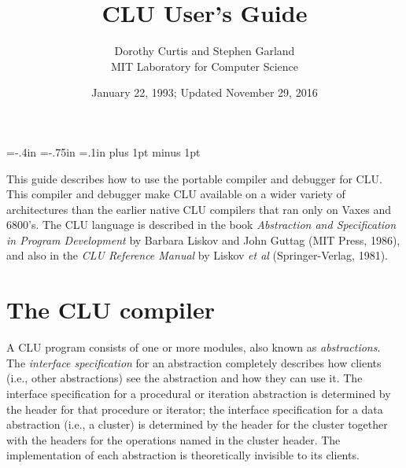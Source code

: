 \textwidth=5.75in
\textheight=7.875in
\hoffset=-.4in
\voffset=-.75in
\parskip=.1in plus 1pt minus 1pt
\leftmargini=12pt
\topsep=0pt
\partopsep=0pt
\itemsep=0pt
\marginparwidth=0.7in
\newcommand{\dir}[1]{{\em #1}}
\newcommand{\proc}[1]{{\em #1}}
\newcommand{\cludir}[1]{\dir{\~{}CLU}{\em #1}}
\newcommand{\fname}[1]{{\em #1}}
\newenvironment{boxdisplay}{\begin{center}\begin{tabular}{|l|}\hline}{\hline\end{tabular}\end{center}}


\title{CLU User's Guide}
\date{January 22, 1993; Updated November 29, 2016}
\author{Dorothy Curtis and Stephen Garland\\
        MIT Laboratory for Computer Science}


\thispagestyle{empty}

\maketitle

This guide describes how to use the portable compiler and debugger for CLU.
This compiler and debugger make CLU available on a wider variety of
architectures than the earlier native CLU compilers that ran only on Vaxes and
6800's.  The CLU language is described in the book {\em Abstraction and
Specification in Program Development} by Barbara Liskov and John Guttag (MIT
Press, 1986), and also in the {\em CLU Reference Manual} by Liskov {\it et al}
(Springer-Verlag, 1981).

\section{The CLU compiler}
\label{clu}

A CLU program consists of one or more modules, also known as {\em
abstractions}.  The {\em interface specification} for an abstraction completely
describes how clients (i.e., other abstractions) see the abstraction and how
they can use it.  The interface specification for a procedural or iteration
abstraction is determined by the header for that procedure or iterator; the
interface specification for a data abstraction (i.e., a cluster) is determined
by the header for the cluster together with the headers for the operations
named in the cluster header.  The implementation of each abstraction is
theoretically invisible to its clients.  


